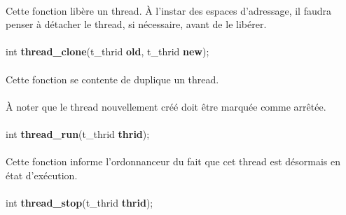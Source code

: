 \documentclass[10pt,a4wide]{article}
\begin{document}
\paragraph{}

Cette fonction lib\`ere un thread. \`A l'instar des espaces d'adressage,
il faudra penser \`a d\'etacher le thread, si n\'ecessaire, avant de
le lib\'erer.

\paragraph{}

\hspace{1.5cm}int \textbf{thread\_clone}(t\_thrid \textbf{old},
                                         t\_thrid \textbf{new});

\paragraph{}

Cette fonction se contente de duplique un thread.

\paragraph{}

\`A noter que le thread nouvellement cr\'e\'e doit \^etre marqu\'ee comme
arr\^et\'ee.

\paragraph{}

\hspace{1.5cm}int \textbf{thread\_run}(t\_thrid \textbf{thrid});

\paragraph{}

Cette fonction informe l'ordonnanceur du fait que cet thread est
d\'esormais en \'etat d'ex\'ecution.

\paragraph{}

\hspace{1.5cm}int \textbf{thread\_stop}(t\_thrid \textbf{thrid});

\paragraph{}
\end{document}
